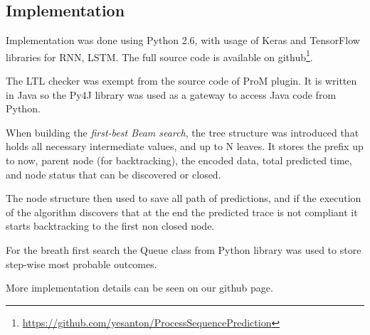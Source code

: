 \subsection{Implementation}
\label{ssec:implementation}

Implementation was done using Python 2.6, with usage of Keras \cite{chollet2015keras} and TensorFlow \cite{tensorflow2015-whitepaper} libraries for RNN, LSTM. The full source code is available on github\footnote{\url{https://github.com/yesanton/ProcessSequencePrediction}}.  

The LTL checker was exempt from the source code of ProM plugin. It is written in Java so the Py4J library was used as a gateway to access Java code from Python.

When building the \textit{first-best Beam search}, the tree structure was introduced that holds all necessary intermediate values, and up to N leaves. It stores the prefix up to now, parent node (for backtracking), the encoded data, total predicted time, and node status that can be discovered or closed.

The node structure then used to save all path of predictions, and if the execution of the algorithm discovers that at the end the predicted trace is not compliant it starts backtracking to the first non closed node. 

For the breath first search the Queue class from Python library was used to store step-wise most probable outcomes.

More implementation details can be seen on our github page.


